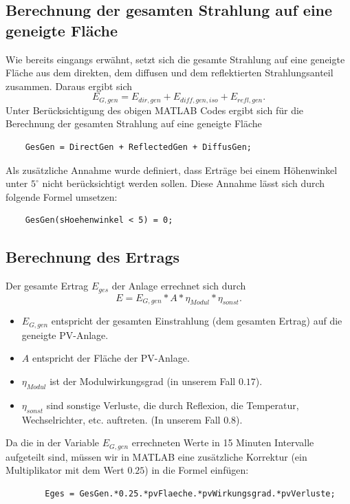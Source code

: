 \documentclass[a4paper,12pt]{article}
\begin{document}
	\subsection{Berechnung der gesamten Strahlung auf eine geneigte Fläche}
	Wie bereits eingangs erwähnt, setzt sich die gesamte Strahlung auf eine geneigte Fläche aus dem direkten, dem diffusen und dem reflektierten Strahlungsanteil zusammen.\newline
	Daraus ergibt sich
	\begin{equation}
		E_{G,gen}=E_{dir,gen}+E_{diff,gen,iso}+E_{refl,gen}.
	\end{equation}
	Unter Berücksichtigung des obigen MATLAB Codes ergibt sich für die Berechnung der gesamten Strahlung auf eine geneigte Fläche
	\begin{lstlisting}
	GesGen = DirectGen + ReflectedGen + DiffusGen;
	\end{lstlisting}
	Als zusätzliche Annahme wurde definiert, dass Erträge bei einem Höhenwinkel unter $5^{\circ}$ nicht berücksichtigt werden sollen.\newline
	Diese Annahme lässt sich durch folgende Formel umsetzen:
	\begin{lstlisting}
	GesGen(sHoehenwinkel < 5) = 0;
	\end{lstlisting}
	\subsection{Berechnung des Ertrags}
	Der gesamte Ertrag $E_{ges}$ der Anlage errechnet sich durch
	\begin{equation}
		E=E_{G,gen}*A*\eta_{Modul}*\eta_{sonst}.
	\end{equation}
	\begin{itemize}
		\item \textbf{$E_{G,gen}$} entspricht der gesamten Einstrahlung (dem gesamten Ertrag) auf die geneigte PV-Anlage.
		\item \textbf{$A$} entspricht der Fläche der PV-Anlage.
		\item \textbf{$\eta_{Modul}$} ist der Modulwirkungsgrad (in unserem Fall $0.17$).
		\item \textbf{$\eta_{sonst}$} sind sonstige Verluste, die durch Reflexion, die Temperatur, Wechselrichter, etc. auftreten. (In unserem Fall $0.8$).
	\end{itemize}
	Da die in der Variable $E_{G,gen}$ errechneten Werte in 15 Minuten Intervalle aufgeteilt sind, müssen wir in MATLAB eine zusätzliche Korrektur (ein Multiplikator mit dem Wert $0.25$) in die Formel einfügen:
	\begin{lstlisting}
		Eges = GesGen.*0.25.*pvFlaeche.*pvWirkungsgrad.*pvVerluste;
	\end{lstlisting}
	\newpage
\end{document}
